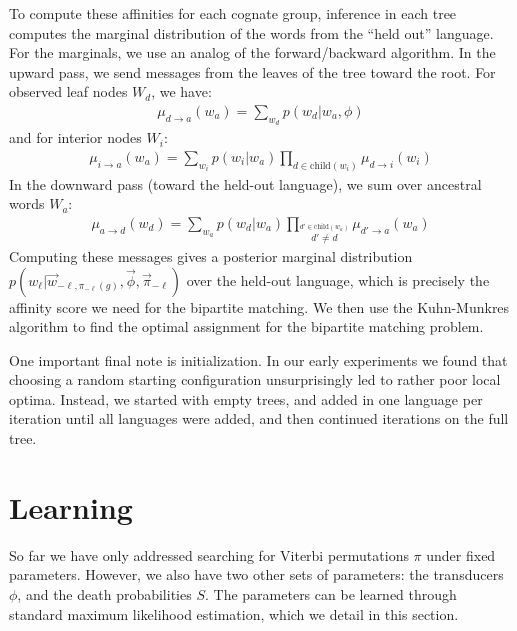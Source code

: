 \documentclass[11pt,a4paper]{article}
\begin{document}
To compute these affinities for each cognate group, inference in each
tree computes the marginal distribution of the words from the ``held
out'' language. For the marginals, we use an analog of the
forward/backward algorithm. In the upward pass, we send messages
from the leaves of the tree toward the root. For observed leaf nodes
$W_d$, we have:
\begin{equation}
  \begin{split}
    \mu_{d\to a}(w_a) = \sum_{w_d} p(w_d|w_a,\phi)
   \end{split}
 \end{equation}
and for interior nodes $W_i$:
\begin{equation}
  \label{eqn:summing}
  \begin{split}
    \mu_{i\to a}(w_a) = \sum_{w_i} p(w_i|w_a) \prod_{d \in \mathrm{child}(w_i)} \mu_{d \to i}(w_i) 
  \end{split}
\end{equation}
In the downward pass (toward the held-out language), we sum over ancestral words $W_a$:
\begin{equation}
  \begin{split}
    \mu_{a\to d}(w_d) = \sum_{w_a} p(w_d|w_a) \prod_{\stackrel{d' \in \mathrm{child}(w_a)}{d' \neq d}} \mu_{d' \to a}(w_a) 
  \end{split}
\end{equation}
Computing these messages gives a posterior marginal distribution
$p(w_\ell|\vec w_{-\ell,\pi_{-\ell}(g)},\vec \phi,\vec\pi_{-\ell})$
over the held-out language, which is precisely the affinity score
we need for the bipartite matching. We then use the Kuhn-Munkres
algorithm \cite{Kuhn1955} to find the optimal assignment for the
bipartite matching problem.

One important final note is initialization. In our early experiments
we found that choosing a random starting configuration unsurprisingly led
to rather poor local optima. Instead, we started with empty trees,
and added in one language per iteration until all languages were
added, and then continued iterations on the full tree.

\section{Learning}

So far we have only addressed searching for Viterbi permutations
$\pi$ under fixed parameters. However, we also have two other sets
of parameters: the transducers $\phi$, and the death probabilities
$S$. The parameters can be learned through standard maximum likelihood
estimation, which we detail in this section.
\end{document}
